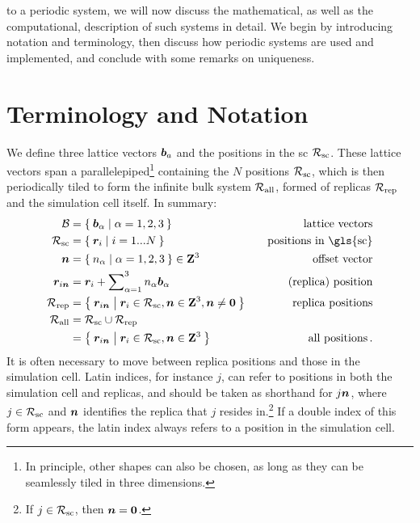  to a periodic system, we will now discuss the mathematical, as well as the computational, description of such systems in detail. We begin by introducing notation and terminology, then discuss how periodic systems are used and implemented, and conclude with some remarks on uniqueness.

\section{Terminology and Notation}
\label{sec:pbc-terms}

We define three lattice vectors $\boldsymbol{b}_a$ and the positions in the \gls{sc} $\mathcal{R_{\text{sc}}}$. These lattice vectors span a parallelepiped\footnote{In principle, other shapes can also be chosen, as long as they can be seamlessly tiled in three dimensions.} containing the $N$ positions $\mathcal{R_{\text{sc}}}$, which is then periodically tiled to form the infinite bulk system $\mathcal{R_{\text{all}}}$, formed of replicas $\mathcal{R_{\text{rep}}}$ and the simulation cell itself. 
In summary:
\begin{alignat}{2}
	\Basis &= \curlyset{\basis_\alpha}{\alpha = 1, 2, 3} & \text{lattice vectors} \nonumber\\
	\Rsc &= \curlyset{\R_i}{i = 1 ... N} & \text{positions in \gls{sc}} \nonumber\\
	\offset &= \curlyset{n_\alpha}{\alpha = 1, 2, 3} \in \wholes^3 & \text{offset vector} \nonumber\\
	\R_{i\offset} &= \R_i + \sum_{\alpha=1}^{3}\nolimits n_\alpha \basis_\alpha & \text{(replica) position} \nonumber\\
	\Rrep &= \curlyset{\R_{i\offset}}{\R_i \in \Rsc, \offset \in \wholes^3, \offset \neq \boldsymbol{0}}\quad & \text{replica positions} \nonumber\\
	\Rall &= \Rsc \cup \Rrep & \nonumber \nonumber\\
	&= \curlyset{\R_{i\offset}}{\R_i \in \Rsc, \offset \in \wholes^3} & \text{all positions} \, .\nonumber
\end{alignat}
It is often necessary to move between replica positions and those in the simulation cell.
Latin indices, for instance $j$, can refer to positions in both the simulation cell and replicas, and should be taken as shorthand for $j\boldsymbol{n}$, where $j \in \mathcal{R_{\text{sc}}}$ and $\boldsymbol{n}$ identifies the replica that $j$ resides in.\footnote{If $j \in \mathcal{R_{\text{sc}}}$, then $\boldsymbol{n} = \boldsymbol{0}$.} If a double index of this form appears, the latin index always refers to a position in the simulation cell.

